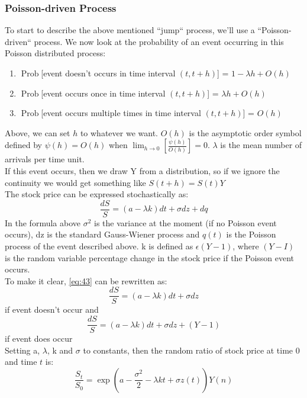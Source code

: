 \documentclass{article}
\DeclareMathOperator{\Prob}{Prob}
\begin{document}
\subsubsection{Poisson-driven Process}
To start to describe the above mentioned “jump“ process, we’ll use a “Poisson-driven“ process. We now look at the probability of an event occurring in this Poisson distributed process:
\begin{enumerate}
    \item $\Prob$[event doesn't occurs in time interval $(t, t+h)$] = $1- \lambda h + O(h)$
    \item $\Prob$[event occurs once in time interval $(t, t+h)$] = $\lambda h + O(h)$
    \item $\Prob$[event occurs multiple times in time interval $(t, t+h)$] = $O(h)$
\end{enumerate}
Above, we can set $h$ to whatever we want. $O(h)$ is the asymptotic order symbol defined by $\psi(h) = O(h)$ when $\lim_{h\to 0} \left[\frac{\psi(h)}{O(h)}\right] = 0.$ $\lambda$ is the mean number of arrivals per time unit. \\ [2ex]
If this event occurs, then we draw Y from a distribution, so if we ignore the continuity we would get something like $S(t+h) = S(t) Y$ \\ 
The stock price can be expressed stochastically as:
\begin{equation}\label{eq:43}
    \frac{dS}{S} = (a - \lambda k) dt + \sigma dz + dq
\end{equation}
In the formula above $\sigma^{2}$ is the variance at the moment (if no Poisson event occurs), dz is the standard Gauss-Wiener process and $q(t)$ is the Poisson process of the event described above. k is defined as $\epsilon(Y - 1)$, where $(Y- I)$ is the random variable percentage change in the stock price if the Poisson event occurs. \\ [2ex]
To make it clear, \ref{eq:43} can be rewritten as:
\begin{equation*}
    \frac{dS}{S} = (a - \lambda k) dt + \sigma dz
\end{equation*}
if event doesn't occur and
\begin{equation*}
    \frac{dS}{S} = (a - \lambda k) dt + \sigma dz + (Y-1)
\end{equation*}
if event does occur\\
Setting a, $\lambda$, k and $\sigma$ to constants, then the random ratio of stock price at time 0 and time $t$ is:
\begin{equation}
    \frac{S_{t}}{S_{0}} = \exp \left(a - \frac{\sigma^{2}}{2} - \lambda k t + \sigma z(t)\right) Y(n)
\end{equation}
\end{document}
